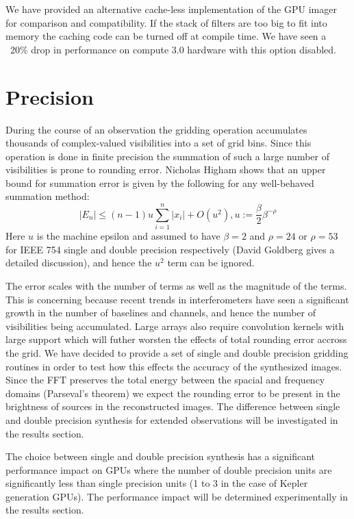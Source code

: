 We have provided an alternative cache-less implementation of the GPU imager for comparison and compatibility.
If the stack of filters are too big to fit into memory the caching code can be turned off at compile time. We have seen
a ~20\% drop in performance on compute 3.0 hardware with this option disabled.

\section{Precision}
During the course of an observation the gridding operation accumulates thousands of complex-valued visibilities into a set of grid bins. Since this operation
is done in finite precision the summation of such a large number of visibilities is prone to rounding error. Nicholas Higham \cite{higham1993accuracy} shows that
an upper bound for summation error is given by the following for any well-behaved summation method:
\begin{equation}
 |E_n| \leq (n-1)u\sum_{i=1}^{n}{|x_i|} + O(u^2), u := \frac{\beta}{2}\beta^{-\rho}
\end{equation}
Here $u$ is the machine epsilon and assumed to have $\beta=2$ and $\rho=24$ or $\rho=53$ for IEEE 754 single and double precision respectively (David Goldberg \cite{goldberg1991every}
gives a detailed discussion), and hence the $u^2$ term can be ignored.

The error scales with the number of terms as well as the magnitude of the terms. This is concerning because recent trends in interferometers have
seen a significant growth in the number of baselines and channels, and hence the number of visibilities being accumulated. Large arrays also require
convolution kernels with large support which will futher worsten the effects of total rounding error accross the grid. We have decided to provide 
a set of single and double precision gridding routines in order to test how this effects the accuracy of the synthesized images. Since the FFT preserves
the total energy between the spacial and frequency domains (Parseval's theorem) we expect the rounding error to be present in the brightness of sources in 
the reconstructed images. The difference between single and double precision synthesis for extended observations will be investigated in the results section.

The choice between single and double precision synthesis has a significant performance impact on GPUs where the number of double precision units are significantly
less than single precision units (1 to 3 in the case of Kepler generation GPUs). The performance impact will be determined experimentally in the results section.
